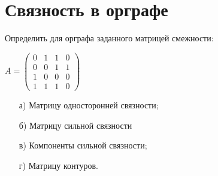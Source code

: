 \section{Связность в орграфе}
Определить для орграфа заданного матрицей смежности:

$A = \begin{pmatrix}
0 & 1 & 1 & 0\\
0 & 0 & 1 & 1\\
1 & 0 & 0 & 0\\
1 & 1 & 1 & 0
\end{pmatrix}$

\begin{enumerate}
\item[а)] Матрицу односторонней связности;
\item[б)] Матрицу сильной связности
\item[в)] Компоненты сильной связности;
\item[г)] Матрицу контуров.
\end{enumerate}

